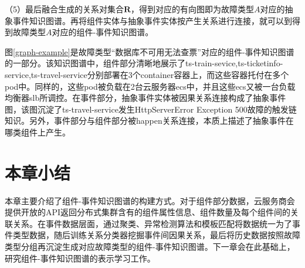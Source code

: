 （5）最后融合生成的关系对集合$\mathbf{R}$，得到对应的有向图即为故障类型$A$对应的抽象事件知识图谱。再将组件实体与抽象事件实体按产生关系进行连接，就可以到得到故障类型$A$对应的组件-事件知识图谱。

图\ref{graph-example}是故障类型“数据库不可用无法查票”对应的组件-事件知识图谱的一部分。该知识图谱中，组件部分清晰地展示了ts-train-sevice,ts-ticketinfo-service,ts-travel-service分别部署在3个container容器上，而这些容器托付在多个pod中。同样的，这些pod被负载在2台云服务器ecs中，并且这些ecs又被一台负载均衡器slb所调控。在事件部分，抽象事件实体被因果关系连接构成了抽象事件图，该图沉淀了ts-travel-service发生HttpServerError Exception 500故障的触发链知识。另外，事件部分与组件部分被happen关系连接，本质上描述了抽象事件在哪类组件上产生。

\section{本章小结}
本章主要介绍了组件-事件知识图谱的构建方式。对于组件部分数据，云服务商会提供开放的API返回分布式集群含有的组件属性信息、组件数量及每个组件间的关联关系。在事件数据层面，通过聚类、异常检测算法和模板匹配将数据统一为了事件类型数据，随后训练关系分类器挖掘事件间因果关系，最后将历史数据按照故障类型分组再沉淀生成对应故障类型的组件-事件知识图谱。下一章会在此基础上，研究组件-事件知识图谱的表示学习工作。


